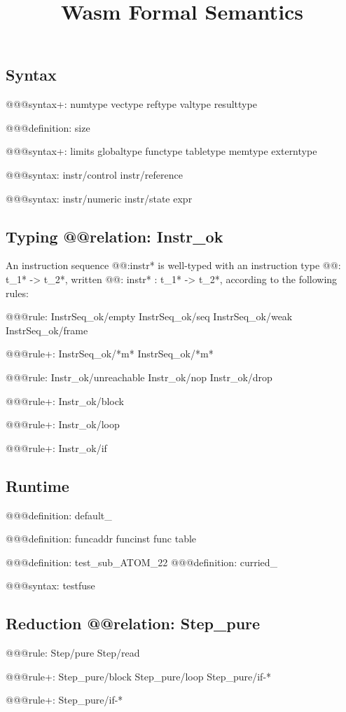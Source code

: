 \documentclass[a4paper]{scrartcl}
\title{Wasm Formal Semantics}
\begin{document}
\small

\maketitle


\subsection*{Syntax}

@@@{syntax+: {numtype vectype reftype valtype} resulttype}

@@@{definition: size}

@@@{syntax+:
  limits
  {globaltype
  functype
  tabletype
  memtype}
  {}
  externtype
}

@@@{syntax: {instr/control instr/reference}}

@@@{syntax: {instr/numeric instr/state} expr}


\subsection*{Typing @@{relation: Instr_ok}}

An instruction sequence @@{:instr*} is well-typed with an instruction type @@{: t_1* -> t_2*}, written @@{: instr* : t_1* -> t_2*}, according to the following rules:

@@@{rule:
  {InstrSeq_ok/empty InstrSeq_ok/seq}
  {InstrSeq_ok/weak InstrSeq_ok/frame}
}

@@@{rule+: InstrSeq_ok/*m* {InstrSeq_ok/*m*}}

@@@{rule: {Instr_ok/unreachable Instr_ok/nop Instr_ok/drop}}

@@@{rule+: Instr_ok/block}

@@@{rule+: Instr_ok/loop}

@@@{rule+: Instr_ok/if}


\subsection*{Runtime}

@@@{definition: default_}

@@@{definition: {funcaddr funcinst} {func table}}

@@@{definition: test_sub_ATOM_22}
@@@{definition: curried_}

@@@{syntax: testfuse}


\subsection*{Reduction @@{relation: Step_pure}}

@@@{rule: Step/pure Step/read}

@@@{rule+: {Step_pure/block Step_pure/loop} {Step_pure/if-*}}

@@@{rule+: Step_pure/if-*}
\end{document}
